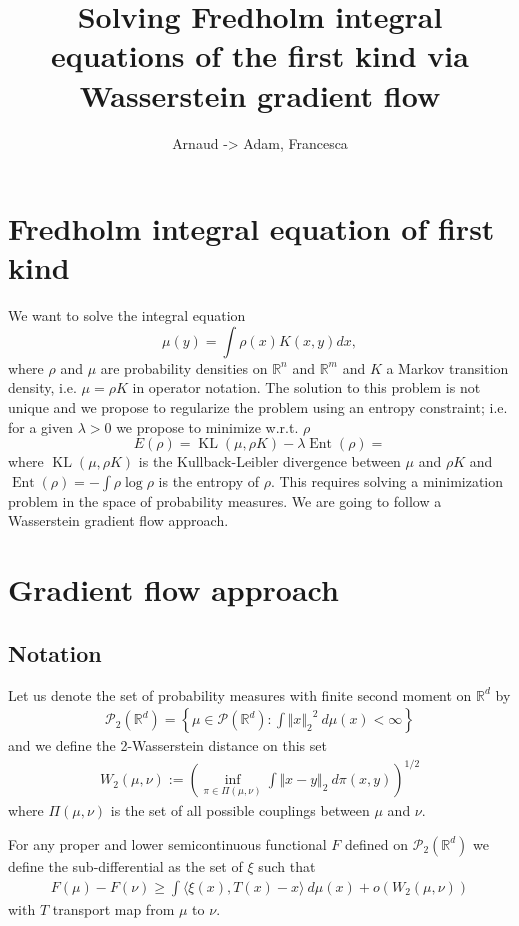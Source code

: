 \documentclass[a4paper]{article}
\title{Solving Fredholm integral equations of the first kind via Wasserstein gradient flow}
\author{Arnaud -> Adam, Francesca }
\date{ }
\DeclareMathOperator{\KL}{KL}
\DeclareMathOperator{\ent}{Ent}
\newcommand{\norm}[2]{\ensuremath{\Vert #1 \Vert_{#2}}}
\def\real{\mathbb{R}}
\begin{document}
\maketitle

\section{Fredholm integral equation of first kind}

We want to solve the integral equation
\[
\mu(y)=\int\rho\left(x\right)K(x,y)dx,
\]
where $\rho$ and $\mu$ are probability densities on $\real^{n}$ and $\real^{m}$ and $K$ a Markov transition density, i.e. $\mu=\rho K$ in operator notation. The solution to this problem is not unique and we propose to regularize the problem using an entropy constraint; i.e. for a given $\lambda>0$ we propose to minimize w.r.t. $\rho$
\begin{equation}
\label{eq:minimisation}
E(\rho)=\KL(\mu,\rho K)-\lambda\ent(\rho) = 
\end{equation}
where 
$\KL(\mu,\rho K)$ is the Kullback-Leibler divergence between $\mu$ and $\rho K$ and $\ent(\rho)=-\int\rho\log\rho$ is the entropy of $\rho$.
This requires solving a minimization problem in the space of probability measures. We are going to follow a Wasserstein gradient flow approach.

\section{Gradient flow approach}
\subsection{Notation}

Let us denote the set of probability measures with finite second moment on $\real^d$ by
\begin{align*}
\mathcal{P}_2(\real^d) = \left\lbrace \mu\in \mathcal{P}(\real^d): \int \norm{ x}{2}^2 \ d\mu(x)< \infty\right\rbrace
\end{align*}
and we define the 2-Wasserstein distance on this set
\begin{align*}
W_2(\mu, \nu) := \left( \inf_{\pi\in\Pi(\mu, \nu)}\int\norm{x - y}{2}\ d\pi(x, y)\right)^{1/2}
\end{align*}
where $\Pi(\mu, \nu)$ is the set of all possible couplings between $\mu$ and $\nu$.

For any proper and lower semicontinuous functional $F$ defined on $\mathcal{P}_2(\real^d)$ we define the sub-differential as the set of $\xi$ such that
\begin{align*}
F(\mu) - F(\nu) \geq \int\langle \xi(x), T(x) - x\rangle\ d\mu(x) +o\left( W_2(\mu, \nu)\right)
\end{align*}
with $T$ transport map from $\mu$ to $\nu$.
\end{document}
